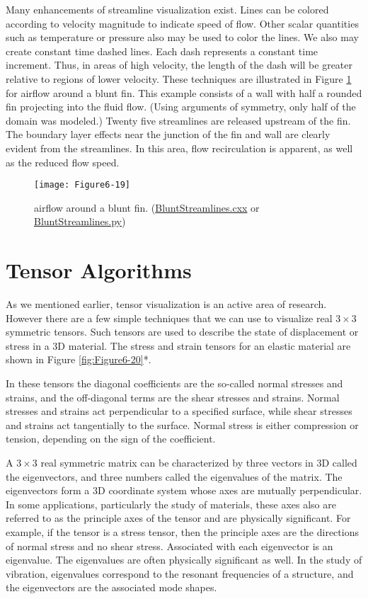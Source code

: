 Many enhancements of streamline visualization exist. Lines can be colored according to velocity magnitude to indicate speed of flow. Other scalar quantities such as temperature or pressure also may be used to color the lines. We also may create constant time dashed lines. Each dash represents a constant time increment. Thus, in areas of high velocity, the length of the dash will be greater relative to regions of lower velocity. These techniques are illustrated in Figure \ref{fig:Figure6-19} for airflow around a blunt fin. This example consists of a wall with half a rounded fin projecting into the fluid flow. (Using arguments of symmetry, only half of the domain was modeled.) Twenty five streamlines are released upstream of the fin. The boundary layer effects near the junction of the fin and wall are clearly evident from the streamlines. In this area, flow recirculation is apparent, as well as the reduced flow speed.

\begin{figure}[htb]
	\texttt{[image: Figure6-19]}
	\caption{airflow around a blunt fin. (\href{https://lorensen.github.io/VTKExamples/site/Cxx/VisualizationAlgorithms/BluntStreamlines}{BluntStreamlines.cxx} or \href{https://lorensen.github.io/VTKExamples/site/Python/VisualizationAlgorithms/BluntStreamlines/}{BluntStreamlines.py})}\label{fig:Figure6-19}
\end{figure}

\section{Tensor Algorithms}

As we mentioned earlier, tensor visualization is an active area of research. However there are a few simple techniques that we can use to visualize real $3 \times 3$ symmetric tensors. Such tensors are used to describe the state of displacement or stress in a 3D material. The stress and strain tensors for an elastic material are shown in Figure \ref{fig:Figure6-20}*.

In these tensors the diagonal coefficients are the so-called normal stresses and strains, and the off-diagonal terms are the shear stresses and strains. Normal stresses and strains act perpendicular to a specified surface, while shear stresses and strains act tangentially to the surface. Normal stress is either compression or tension, depending on the sign of the coefficient.

A $3 \times 3$ real symmetric matrix can be characterized by three vectors in 3D called the eigenvectors, and three numbers called the eigenvalues of the matrix. The eigenvectors form a 3D coordinate system whose axes are mutually perpendicular. In some applications, particularly the study of materials, these axes also are referred to as the principle axes of the tensor and are physically significant. For example, if the tensor is a stress tensor, then the principle axes are the directions of normal stress and no shear stress. Associated with each eigenvector is an eigenvalue. The eigenvalues are often physically significant as well. In the study of vibration, eigenvalues correspond to the resonant frequencies of a structure, and the eigenvectors are the associated mode shapes.

